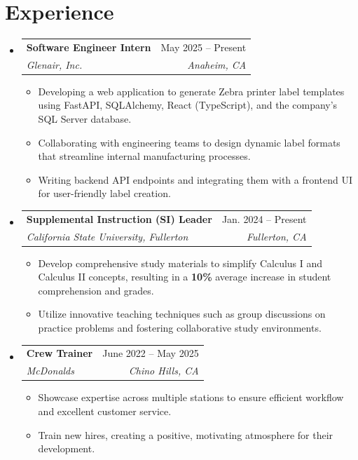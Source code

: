 \documentclass[letterpaper,11pt]{article}
\makeatletter
\newcommand{\resumeItem}[1]{
  \item\small{
    {#1 \vspace{-2pt}}
  }
}
\newcommand{\resumeSubheading}[4]{
  \vspace{-2pt}\item
    \begin{tabular*}{0.97\textwidth}[t]{l@{\extracolsep{\fill}}r}
      \textbf{#1} & #2 \\
      \textit{\small#3} & \textit{\small #4} \\
    \end{tabular*}\vspace{-7pt}
}
\newcommand{\resumeSubSubheading}[2]{
    \item
    \begin{tabular*}{0.97\textwidth}{l@{\extracolsep{\fill}}r}
      \textit{\small#1} & \textit{\small #2} \\
    \end{tabular*}\vspace{-7pt}
}
\newcommand{\resumeSubHeadingListStart}{\begin{itemize}[leftmargin=0.15in, label={}]}
\newcommand{\resumeSubHeadingListEnd}{\end{itemize}}
\newcommand{\resumeItemListStart}{\begin{itemize}}
\newcommand{\resumeItemListEnd}{\end{itemize}\vspace{-5pt}}
\makeatother
\begin{document}
\section{Experience}
  \resumeSubHeadingListStart
    \resumeSubheading
      {Software Engineer Intern}{May 2025 -- Present}
      {Glenair, Inc.}{Anaheim, CA}
      \resumeItemListStart
        \resumeItem{Developing a web application to generate Zebra printer label templates using FastAPI, SQLAlchemy, React (TypeScript), and the company’s SQL Server database.}
        \resumeItem{Collaborating with engineering teams to design dynamic label formats that streamline internal manufacturing processes.}
        \resumeItem{Writing backend API endpoints and integrating them with a frontend UI for user-friendly label creation.}
      \resumeItemListEnd
      

    \resumeSubheading
      {Supplemental Instruction (SI) Leader}{Jan. 2024 -- Present}
      {California State University, Fullerton}{Fullerton, CA}
      \resumeItemListStart
        \resumeItem{Develop comprehensive study materials to simplify Calculus I and Calculus II concepts, resulting in a \textbf{10\%} average increase in student comprehension and grades.}
        \resumeItem{Utilize innovative teaching techniques such as group discussions on practice problems and fostering collaborative study environments.}
    \resumeItemListEnd

    \resumeSubheading
      {Crew Trainer}{June 2022 -- May 2025}
      {McDonalds}{Chino Hills, CA}
      \resumeItemListStart
        \resumeItem{Showcase expertise across multiple stations to ensure efficient workflow and excellent customer service.}
        \resumeItem{Train new hires, creating a positive, motivating atmosphere for their development.}
    \resumeItemListEnd


  \resumeSubHeadingListEnd


\end{document}
